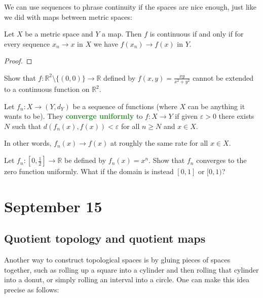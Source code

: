 \documentclass[11pt]{scrartcl}
\providecommand{\eps}{\varepsilon}
\providecommand{\half}{\frac{1}{2}}
\providecommand{\RR}{\mathbb R}
\providecommand{\vocab}[1]{{\textbf{\textcolor{ForestGreen}{#1}}}}
\begin{document}
We can use sequences to phrase continuity if the spaces are nice enough,
just like we did with maps between metric spaces:
\begin{theorem}
    \label{thm:seq-cont-dom-metric-sp}
    Let $X$ be a metric space and $Y$ a map.
    Then $f$ is continuous if and only if for every sequence
    $x_n\to x$ in $X$ we have $f(x_n)\to f(x)$ in $Y$.
\end{theorem}

\begin{proof}
\end{proof}

\begin{exercise}
    Show that $f\colon\RR^2\setminus\{(0,0)\}\to\RR$ defined by
    $f(x,y) = \frac{xy}{x^2+y^2}$ cannot be extended
    to a continuous function on $\RR^2$.
\end{exercise}

\begin{definition}
    \label{def:uniform-convergence}
    Let $f_n\colon X\to(Y,d_Y)$ be a sequence of functions
    (where $X$ can be anything it wants to be).
    They \vocab{converge uniformly} to $f\colon X\to Y$ if
    given $\eps>0$ there exists $N$ such that $d(f_n(x), f(x)) < \eps$
    for all $n\ge N$ and $x\in X$.
\end{definition}
In other words, $f_n(x)\to f(x)$ at roughly the same rate for all $x\in X$.

\begin{exercise}
    Let $f_n\colon[0,\half]\to\RR$ be defined by $f_n(x) = x^n$.
    Show that $f_n$ converges to the zero function uniformly.
    What if the domain is instead $[0,1]$ or $[0,1)$?
\end{exercise}

\section{September 15}\label{sec:sep15}
\subsection{Quotient topology and quotient maps}

Another way to construct topological spaces is by gluing pieces of
spaces together, such as rolling up a square into a cylinder
and then rolling that cylinder into a donut,
or simply rolling an interval into a circle.
One can make this idea precise as follows:
\end{document}
